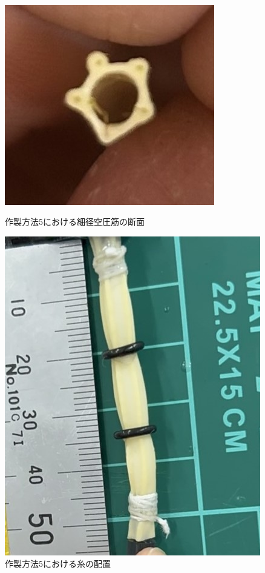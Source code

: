 　\begin{figure}[htbp]
  \centering
  \begin{minipage}[b]{0.49\hsize}
      \centering
      \includegraphics[scale=0.5]{pic/2sou.jpg}
      \caption{作製方法5における細径空圧筋の断面}
      \label{fig:2sou}
  \end{minipage} \hfill
  \begin{minipage}[b]{0.49\hsize}
      \centering
      \includegraphics[scale=0.4]{pic/kutu.jpg}
      \caption{作製方法5における糸の配置}
      \label{fig:kutu}
  \end{minipage} 
\end{figure}


